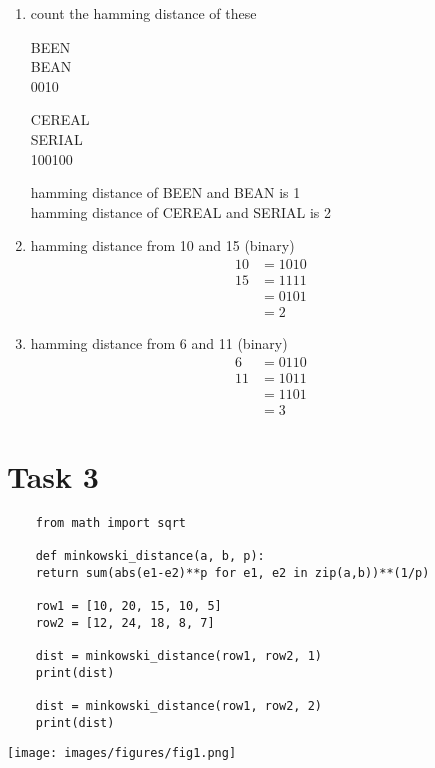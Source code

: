 \documentclass[12pt,titlepage]{article}
\begin{document}
\begin{enumerate}
    \item count the hamming distance of these
    \begin{center}
        BEEN\\
        BEAN\\
        0010
    \end{center}
    \begin{center}
        CEREAL\\
        SERIAL\\
        100100
    \end{center}
    hamming distance of BEEN and BEAN is 1\\
    hamming distance of CEREAL and SERIAL is 2
    \item hamming distance from 10 and 15 (binary)
    \begin{align*}
        10 &= 1010\\
        15 &= 1111\\
        &= 0101\\
        &= 2
    \end{align*}
    \item hamming distance from 6 and 11 (binary)
    \begin{align*}
        6 &= 0110\\
        11 &= 1011\\
        &= 1101\\
        &= 3
    \end{align*}
\end{enumerate}

\newpage

\section*{Task 3}

\begin{verbatim}
    from math import sqrt

    def minkowski_distance(a, b, p):
    return sum(abs(e1-e2)**p for e1, e2 in zip(a,b))**(1/p)

    row1 = [10, 20, 15, 10, 5]
    row2 = [12, 24, 18, 8, 7]

    dist = minkowski_distance(row1, row2, 1)
    print(dist)

    dist = minkowski_distance(row1, row2, 2)
    print(dist)
\end{verbatim}

\texttt{[image: images/figures/fig1.png]}
\end{document}
